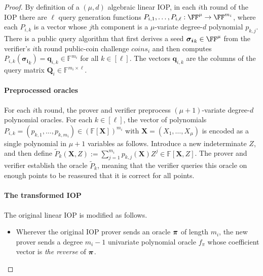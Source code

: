 \begin{proof}
By definition of a $(\mu, d)$ algebraic linear IOP, in each $i$th round of the IOP there are $\ell$ query generation functions $P_{i,1},\ldots,P_{i,\ell}: \FF^\mu \rightarrow \FF^{m_i}$, where each $P_{i,k}$ is a vector whose $j$th component is a $\mu$-variate degree-$d$ polynomial $p_{k,j}$. There is a public query algorithm that first derives a seed $\boldsymbol{\sigma_i}_k \in \FF^\mu$ from the verifier's $i$th round public-coin challenge $\mathit{coins}_i$ and then computes $P_{i,k}(\boldsymbol{\sigma_i}_k) = \mathbf{q}_{i,k} \in \mathbb{F}^{m_i}$ for all $k \in [\ell]$. The vectors $\mathbf{q}_{i,k}$ are the columns of the query matrix $\mathbf{Q}_i \in \mathbb{F}^{m_i \times \ell}$.

\paragraph{Preprocessed oracles} 
For each $i$th round, the prover and verifier preprocess $(\mu+1)$-variate degree-$d$ polynomial oracles. %
For each $k \in [\ell]$, the vector of polynomials $P_{i,k} = (p_{k,1},\ldots,p_{k, m_i}) \in (\mathbb{F}[\mathbf{X}])^{m_i}$ with $\mathbf{X} = (X_1,\ldots,X_\mu)$ is encoded as a single polynomial in $\mu + 1$ variables as follows. Introduce a new indeterminate $Z$, and then define $\tilde{P}_k(\mathbf{X}, Z) := \sum_{j=1}^{m_i} p_{k,j}(\mathbf{X}) Z^j \in \mathbb{F}[\mathbf{X},Z]$.
The prover and verifier establish the oracle $\tilde{P}_k$, meaning that the verifier queries this oracle on enough points to be reassured that it is correct for all points.

\paragraph{The transformed IOP} 
The original linear IOP is modified as follows. 

\begin{itemize}

\item Wherever the original IOP prover sends an oracle $\boldsymbol{\pi}$ of length $m_i$, the new prover sends a degree $m_i - 1$ univariate polynomial oracle $f_\pi$ whose coefficient vector is \emph{the reverse} of $\boldsymbol{\pi}$. 


\end{itemize}
\end{proof}
